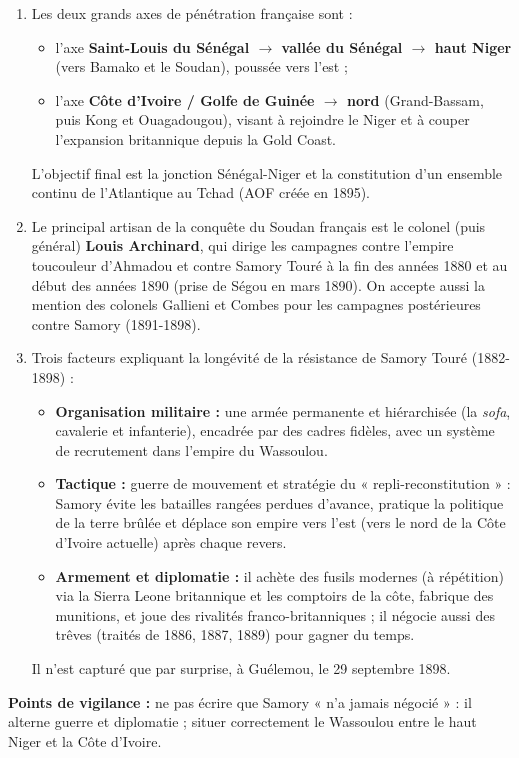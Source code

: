 \documentclass[11pt]{article}
\begin{document}
\begin{corrige}
\begin{enumerate}
    \item Les deux grands axes de pénétration française sont :
    \begin{itemize}
        \item l'axe \textbf{Saint-Louis du Sénégal $\rightarrow$ vallée du Sénégal $\rightarrow$ haut Niger} (vers Bamako et le Soudan), poussée vers l'est ;
        \item l'axe \textbf{Côte d'Ivoire / Golfe de Guinée $\rightarrow$ nord} (Grand-Bassam, puis Kong et Ouagadougou), visant à rejoindre le Niger et à couper l'expansion britannique depuis la Gold Coast.
    \end{itemize}
    L'objectif final est la jonction Sénégal-Niger et la constitution d'un ensemble continu de l'Atlantique au Tchad (AOF créée en 1895).
    \item Le principal artisan de la conquête du Soudan français est le colonel (puis général) \textbf{Louis Archinard}, qui dirige les campagnes contre l'empire toucouleur d'Ahmadou et contre Samory Touré à la fin des années 1880 et au début des années 1890 (prise de Ségou en mars 1890). On accepte aussi la mention des colonels Gallieni et Combes pour les campagnes postérieures contre Samory (1891-1898).
    \item Trois facteurs expliquant la longévité de la résistance de Samory Touré (1882-1898) :
    \begin{itemize}
        \item \textbf{Organisation militaire :} une armée permanente et hiérarchisée (la \emph{sofa}, cavalerie et infanterie), encadrée par des cadres fidèles, avec un système de recrutement dans l'empire du Wassoulou.
        \item \textbf{Tactique :} guerre de mouvement et stratégie du « repli-reconstitution » : Samory évite les batailles rangées perdues d'avance, pratique la politique de la terre brûlée et déplace son empire vers l'est (vers le nord de la Côte d'Ivoire actuelle) après chaque revers.
        \item \textbf{Armement et diplomatie :} il achète des fusils modernes (à répétition) via la Sierra Leone britannique et les comptoirs de la côte, fabrique des munitions, et joue des rivalités franco-britanniques ; il négocie aussi des trêves (traités de 1886, 1887, 1889) pour gagner du temps.
    \end{itemize}
    Il n'est capturé que par surprise, à Guélemou, le 29 septembre 1898.
\end{enumerate}
\textbf{Points de vigilance :} ne pas écrire que Samory « n'a jamais négocié » : il alterne guerre et diplomatie ; situer correctement le Wassoulou entre le haut Niger et la Côte d'Ivoire.
\end{corrige}
\end{document}
